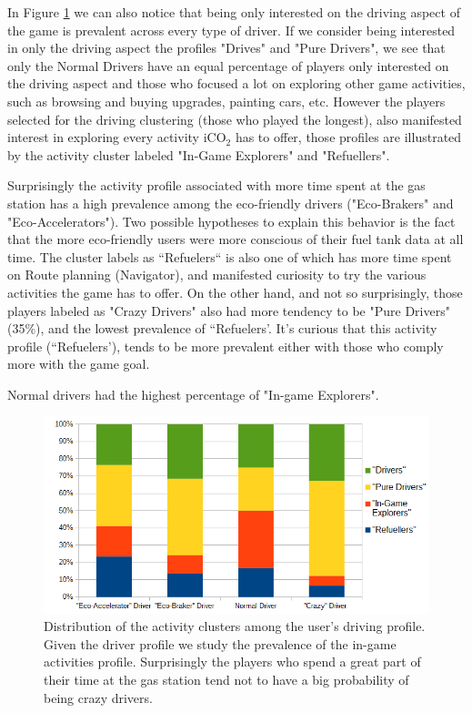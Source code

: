 \documentclass[preprint,authoryear,12pt]{elsarticle}
\begin{document}
In Figure \ref{fig:activity_driving} we can also notice that being only interested on the driving aspect of the game is prevalent across every type of driver. 
If we consider being interested in only the driving aspect the profiles "Drives" and "Pure Drivers", we see that only the Normal Drivers have an equal percentage of players only interested on the driving aspect and those who focused a lot on exploring other game activities, such as browsing and buying upgrades, painting cars, etc. However the players selected for the driving clustering (those who played the longest), also manifested interest in exploring every activity iCO$_2$ has to offer, those profiles are illustrated by the activity cluster labeled "In-Game Explorers" and "Refuellers".

Surprisingly the activity profile associated with more time spent at the gas station has a high prevalence among the eco-friendly drivers ("Eco-Brakers" and "Eco-Accelerators"). Two possible hypotheses to explain this behavior is the fact that the more eco-friendly users were more conscious of their fuel tank data at all time. The cluster labels as ``Refuelers`` is also one of which has more time spent on Route planning (Navigator), and manifested curiosity to try the various activities the game has to offer. On the other hand, and not so surprisingly, those players labeled as "Crazy Drivers" also had more tendency to be "Pure Drivers" (35\%), and the lowest prevalence of ``Refuelers'. It's curious that this activity profile (``Refuelers'), tends to be more prevalent either with those who comply more with the game goal. 

Normal drivers had the highest percentage of "In-game Explorers".



\begin{figure}[htb]
	\begin{center}
		\includegraphics[width=.8\linewidth]{ijhcs14-img/cluster_activities_driver_types}
		\caption{Distribution of the activity clusters among the user's driving profile. Given the driver profile we study the prevalence of the in-game activities profile. Surprisingly the players who spend a great part of their time at the gas station tend not to have a big probability of being crazy drivers. \label{fig:activity_driving}}
	\end{center}
\end{figure}
\end{document}
